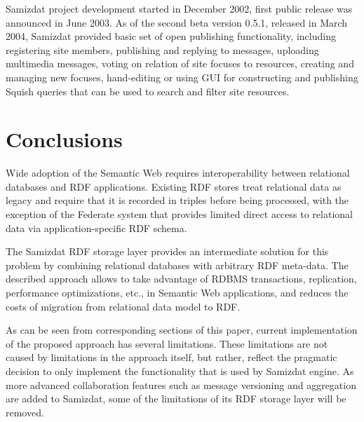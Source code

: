 \documentclass{llncs}
\begin{document}
Samizdat project development started in December 2002, first public release
was announced in June 2003. As of the second beta version 0.5.1, released in
March 2004, Samizdat provided basic set of open publishing functionality,
including registering site members, publishing and replying to messages,
uploading multimedia messages, voting on relation of site focuses to
resources, creating and managing new focuses, hand-editing or using GUI for
constructing and publishing Squish queries that can be used to search and
filter site resources.

\section{Conclusions}

Wide adoption of the Semantic Web requires interoperability between relational
databases and RDF applications. Existing RDF stores treat relational data as
legacy and require that it is recorded in triples before being processed, with
the exception of the Federate system that provides limited direct access to
relational data via application-specific RDF schema.

The Samizdat RDF storage layer provides an intermediate solution for this
problem by combining relational databases with arbitrary RDF meta-data. The
described approach allows to take advantage of RDBMS transactions,
replication, performance optimizations, etc., in Semantic Web applications,
and reduces the costs of migration from relational data model to RDF.

As can be seen from corresponding sections of this paper, current
implementation of the proposed approach has several limitations. These
limitations are not caused by limitations in the approach itself, but rather,
reflect the pragmatic decision to only implement the functionality that is
used by Samizdat engine. As more advanced collaboration features such as
message versioning and aggregation are added to Samizdat, some of the
limitations of its RDF storage layer will be removed.
\end{document}
